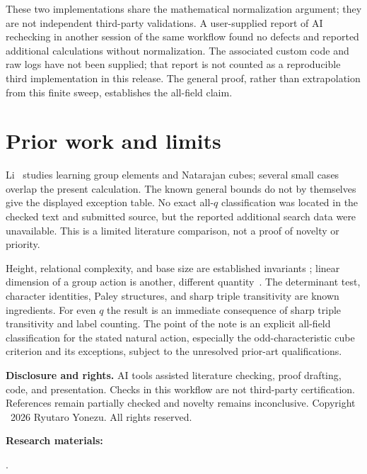 \documentclass[11pt,a4paper]{article}
\begin{document}
These two implementations share the mathematical normalization argument;
they are not independent third-party validations. A user-supplied report
of AI rechecking in another session of the same workflow found no defects
and reported additional calculations without normalization. The associated
custom code and raw logs have not been supplied; that report is not counted
as a reproducible third implementation in this release.
The general proof, rather than extrapolation from this finite sweep,
establishes the all-field claim.

\section{Prior work and limits}
Li~\cite{li} studies learning group elements and Natarajan cubes; several
small cases overlap the present calculation. The known general bounds do
not by themselves give the displayed exception table. No exact all-$q$
classification was located in the checked text and submitted source, but
the reported additional search data were unavailable. This is a limited
literature comparison, not a proof of novelty or priority.

Height, relational complexity, and base size are established invariants
\cite{gls,hudson}; linear dimension of a group action is another, different
quantity~\cite{devillers}. The determinant test, character identities,
Paley structures, and sharp triple transitivity are known ingredients.
For even $q$ the result is an immediate consequence of sharp triple
transitivity and label counting. The point of the note is an explicit
all-field classification for the stated natural action, especially the
odd-characteristic cube criterion and its exceptions, subject to the
unresolved prior-art qualifications.

\noindent\textbf{Disclosure and rights.} AI tools assisted literature checking,
proof drafting, code, and presentation. Checks in this workflow are not
third-party certification. References remain partially checked and novelty
remains inconclusive. Copyright \textcopyright\ 2026 Ryutaro Yonezu.
All rights reserved.

\medskip
\noindent\textbf{Research materials:}\par\nobreak
{}.
\end{document}
